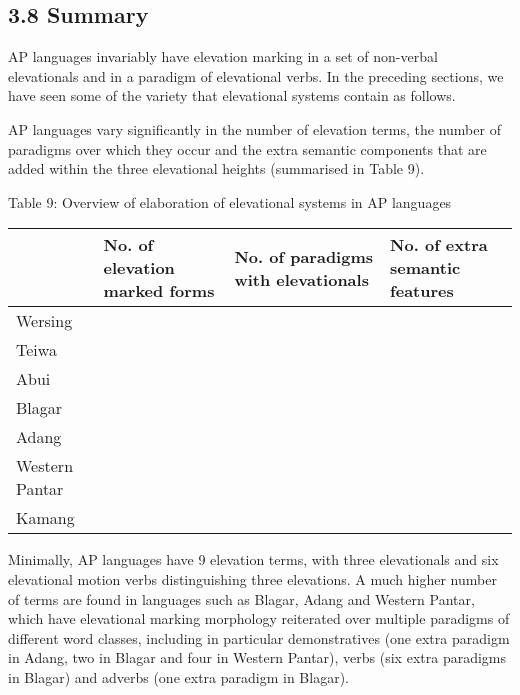 \subsection[3.8 Summary]{3.8 Summary}
AP languages invariably have elevation marking in a set of non-verbal elevationals and in a paradigm of elevational verbs. In the preceding sections, we have seen some of the variety that elevational systems contain as follows. 

AP languages vary significantly in the number of elevation terms, the number of paradigms over which they occur and the extra semantic components that are added within the three elevational heights (summarised in Table 9). 

{\centering
Table 9: Overview of elaboration of elevational systems in AP languages
\par}

\begin{center}
\tablehead{}
\begin{supertabular}{m{1.0844599in}m{1.1136599in}m{1.1129599in}m{1.1156598in}}
\hline
 &
No. of elevation marked forms &
No. of paradigms with elevationals  &
No. of extra semantic features\\\hline
Wersing &
 &
 &
\centering{}\\
Teiwa &
 &
 &
\centering{}\\
Abui &
 &
 &
\centering{}\\
Blagar &
 &
 &
\centering{}\\
Adang  &
 &
 &
\centering{}\\
Western Pantar &
 &
 &
\centering{}\\
Kamang &
 &
 &
\centering{}\\\hline
\end{supertabular}
\end{center}
Minimally, AP languages have 9 elevation terms, with three elevationals and six elevational motion verbs distinguishing three elevations. A much higher number of terms are found in languages such as Blagar, Adang and Western Pantar, which have elevational marking morphology reiterated over multiple paradigms of different word classes, including in particular demonstratives (one extra paradigm in Adang, two in Blagar and four in Western Pantar), verbs (six extra paradigms in Blagar) and adverbs (one extra paradigm in Blagar).

